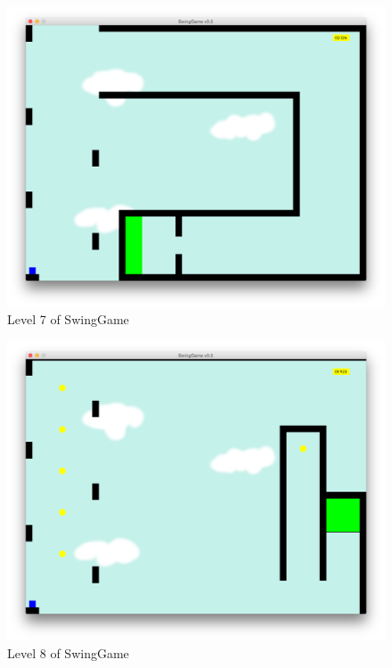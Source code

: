 \documentclass[]{report}
\begin{document}
\begin{appendices}
\begin{figure}[H]
			\includegraphics[scale=0.25]{level7}
			\caption{Level 7 of SwingGame}
			\label{level7}
		\end{figure}
		\begin{figure}[H]
			\centering
			\includegraphics[scale=0.25]{level8}
			\caption{Level 8 of SwingGame}
			\label{level8}
		\end{figure}
		\begin{figure}[H]
			\centering

\end{figure}
\end{appendices}
\end{document}
